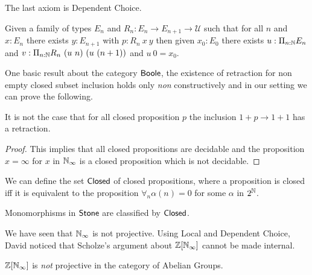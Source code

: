 The last axiom is Dependent Choice.

\begin{axiomNum}
  Given a family of types $E_n$ and $R_n:E_n\rightarrow E_{n+1}\rightarrow {\mathcal U}$ such that
  for all $n$ and $x:E_n$ there exists $y:E_{n+1}$ with $p:R_n~x~y$ then given $x_0:E_0$ there exists
  $u:\Pi_{n:\mathbb{N}}E_n$ and $v:\Pi_{n:\mathbb{N}}R_n~(u~n)~(u~(n+1))$ and $u~0 = x_0$.
\end{axiomNum}

\medskip

One basic result about the category $\mathsf{Boole}$, the existence of retraction for non empty closed subset inclusion
holds only {\em non} constructively and in our setting we can prove the following.


\begin{proposition}
 It is not the case that for all closed proposition $p$ the inclusion $1+p\rightarrow 1+1$ has a retraction.
\end{proposition}

\begin{proof}
  This implies that all closed propositions are decidable and the proposition $x=\infty$ for $x$ in $\mathbb{N}_{\infty}$ is a
  closed proposition which is not decidable.
\end{proof}

\medskip

We can define the set $\mathsf{Closed}$ of closed propositions, where a proposition is closed iff it is equivalent to
the proposition $\forall_n \alpha(n) = 0$ for some $\alpha$ in $2^{\mathbb{N}}$.

\begin{theorem}
  Monomorphisms in $\mathsf{Stone}$ are classified by $\mathsf{Closed}$.
\end{theorem}

\medskip

We have seen that $\mathbb{N}_{\infty}$ is not projective. Using Local and Dependent Choice, David noticed that Scholze's argument
about $\mathbb{Z}[\mathbb{N}_{\infty}]$ cannot be made internal.

\begin{theorem}
   $\mathbb{Z}[\mathbb{N}_{\infty}]$ is {\em not} projective in the category of Abelian Groups.
\end{theorem}

